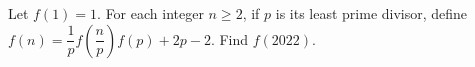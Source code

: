 Let $f(1)=1$. For each integer $n\ge2$, if $p$ is its least prime divisor, define $f(n)=\dfrac{1}{p} f(\dfrac{n}{p})f(p)+2p-2$. Find $f(2022)$.
